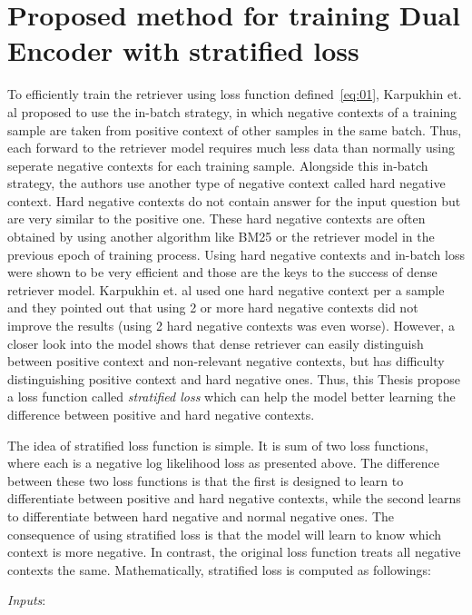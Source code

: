\documentclass[12pt, sort&compress]{report}
\begin{document}
\section{Proposed method for training Dual Encoder with stratified loss}
\par To efficiently train the retriever using loss function defined~\eqref{eq:01}, Karpukhin et. al \cite{karpukhin2020dense} proposed to use the in-batch strategy, in which negative contexts of a training sample are taken from positive context of other samples in the same batch. Thus, each forward to the retriever model requires much less data than normally using seperate negative contexts for each training sample. Alongside this in-batch strategy, the authors use another type of negative context called hard negative context. Hard negative contexts do not contain answer for the input question but are very similar to the positive one. These hard negative contexts are often obtained by using another algorithm like BM25 or the retriever model in the previous epoch of training process. Using hard negative contexts and in-batch loss were shown to be very efficient and those are the keys to the success of dense retriever model. Karpukhin et. al used one hard negative context per a sample and they pointed out that using 2 or more hard negative contexts did not improve the results (using 2 hard negative contexts was even worse). However, a closer look into the model shows that dense retriever can easily distinguish between positive context and non-relevant negative contexts, but has difficulty distinguishing positive context and hard negative ones. Thus, this Thesis propose a loss function called \textit{stratified loss} which can help the model better learning the difference between positive and hard negative contexts.
\par The idea of stratified loss function is simple. It is sum of two loss functions, where each is a negative log likelihood loss as presented above. The difference between these two loss functions is that the first is designed to learn to differentiate between positive and hard negative contexts, while the second learns to differentiate between hard negative and normal negative ones. The consequence of using stratified loss is that the model will learn to know which context is more negative. In contrast, the original loss function treats all negative contexts the same. Mathematically, stratified loss is computed as followings:
\par\textit{Inputs}:
\end{document}
